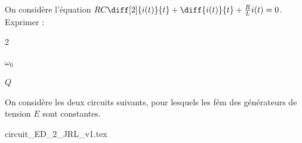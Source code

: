 \bigskip

On considère l'équation $RC\diff[2]{i(t)}{t} + \diff{i(t)}{t} + \frac{R}{L} i(t) = 0 $. Exprimer :

\bigskip

\begin{multicols}{2}


\begin{enonce}
$\omega_0$
\end{enonce}





\begin{enonce}
$Q$
\end{enonce}



\end{multicols}

\finEntrainement






\hauteurLargeurCadreReponse		{8mm}{8cm}
\typeEntrainement				{} %
\initialisationEntrainement


On considère les deux circuits suivants, pour lesquels les fém des générateurs de tension $E$ sont constantes.
\begin{center}
{circuit_ED_2_JRL_v1.tex}
\end{center}

